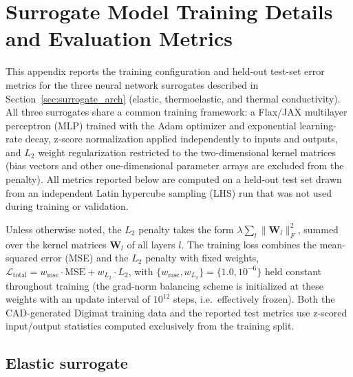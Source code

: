 \documentclass[preprint,review,10pt,number]{elsarticle}
\begin{document}
\fontsize{10}{10}\selectfont



\appendix

\renewcommand{\thefigure}{A.\arabic{figure}}
\renewcommand{\thetable}{A.\arabic{table}}

\setcounter{figure}{0}
\setcounter{table}{0}

\section{Surrogate Model Training Details and Evaluation Metrics}
\label{app:surrogate_details}

This appendix reports the training configuration and held-out test-set
error metrics for the three neural network surrogates described in
Section~\ref{sec:surrogate_arch} (elastic, thermoelastic, and thermal
conductivity). All three surrogates share a common training framework:
a Flax/JAX multilayer perceptron (MLP) trained with the Adam optimizer
and exponential learning-rate decay, z-score normalization applied
independently to inputs and outputs, and $L_2$ weight regularization
restricted to the two-dimensional kernel matrices (bias vectors and
other one-dimensional parameter arrays are excluded from the penalty).
All metrics reported below are computed on a held-out test set drawn
from an independent Latin hypercube sampling (LHS) run that was not
used during training or validation.

Unless otherwise noted, the $L_2$ penalty takes the form
$\lambda \sum_l \lVert \mathbf{W}_l \rVert_F^2$, summed over the kernel
matrices $\mathbf{W}_l$ of all layers $l$. The training loss combines
the mean-squared error (MSE) and the $L_2$ penalty with fixed weights,
$\mathcal{L}_{\text{total}} = w_{\text{mse}} \cdot \text{MSE} +
w_{L_2} \cdot L_2$, with $\{w_{\text{mse}}, w_{L_2}\} = \{1.0,
10^{-6}\}$ held constant throughout training (the grad-norm balancing
scheme is initialized at these weights with an update interval of
$10^{12}$ steps, i.e.\ effectively frozen). Both the CAD-generated
Digimat training data and the reported test metrics use z-scored
input/output statistics computed exclusively from the training split.

\subsection{Elastic surrogate}
\label{app:elastic_surrogate}
\end{document}
